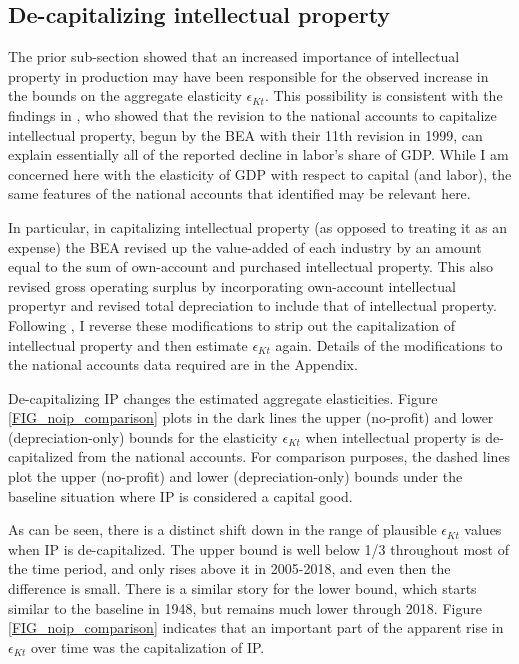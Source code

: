 \documentclass[11pt]{article}
\begin{document}
\subsection{De-capitalizing intellectual property}
The prior sub-section showed that an increased importance of intellectual property in production may have been responsible for the observed increase in the bounds on the aggregate elasticity $\epsilon_{Kt}$. This possibility is consistent with the findings in \cite{ksz2020}, who showed that the revision to the national accounts to capitalize intellectual property, begun by the BEA with their 11th revision in 1999, can explain essentially all of the reported decline in labor's share of GDP. While I am concerned here with the elasticity of GDP with respect to capital (and labor), the same features of the national accounts that \cite{ksz2020} identified may be relevant here. 

In particular, in capitalizing intellectual property (as opposed to treating it as an expense) the BEA revised up the value-added of each industry by an amount equal to the sum of own-account and purchased intellectual property. This also revised gross operating surplus by incorporating own-account intellectual propertyr and revised total depreciation to include that of intellectual property. Following \cite{ksz2020}, I reverse these modifications to strip out the capitalization of intellectual property and then estimate $\epsilon_{Kt}$ again. Details of the modifications to the national accounts data required are in the Appendix.

De-capitalizing IP changes the estimated aggregate elasticities. Figure \ref{FIG_noip_comparison} plots in the dark lines the upper (no-profit) and lower (depreciation-only) bounds for the elasticity $\epsilon_{Kt}$ when intellectual property is de-capitalized from the national accounts. For comparison purposes, the dashed lines plot the upper (no-profit) and lower (depreciation-only) bounds under the baseline situation where IP is considered a capital good. 

As can be seen, there is a distinct shift down in the range of plausible $\epsilon_{Kt}$ values when IP is de-capitalized. The upper bound is well below 1/3 throughout most of the time period, and only rises above it in 2005-2018, and even then the difference is small. There is a similar story for the lower bound, which starts similar to the baseline in 1948, but remains much lower through 2018. Figure \ref{FIG_noip_comparison} indicates that an important part of the apparent rise in $\epsilon_{Kt}$ over time was the capitalization of IP. 
\end{document}
